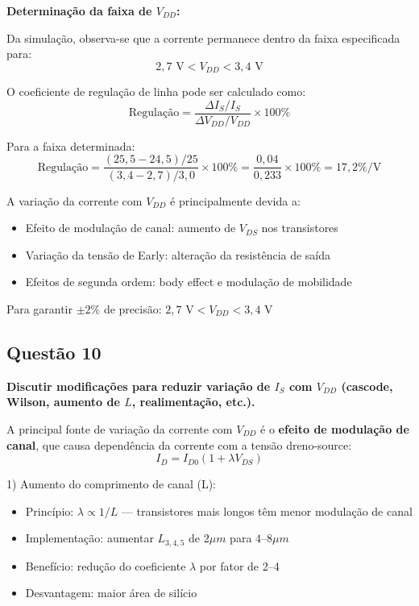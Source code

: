 ﻿\documentclass[12pt,a4paper]{article}
\begin{document}
\textbf{Determinação da faixa de $V_{DD}$:}

Da simulação, observa-se que a corrente permanece dentro da faixa especificada para:
$$2,7 \text{ V} < V_{DD} < 3,4 \text{ V}$$



O coeficiente de regulação de linha pode ser calculado como:
$$\text{Regulação} = \frac{\Delta I_S / I_S}{\Delta V_{DD} / V_{DD}} \times 100\% $$

Para a faixa determinada:
$$\text{Regulação} = \frac{(25,5-24,5)/25}{(3,4-2,7)/3,0} \times 100\% = \frac{0,04}{0,233} \times 100\% = 17,2\%/\text{V}$$



A variação da corrente com $V_{DD}$ é principalmente devida a:
\begin{itemize}
    \item Efeito de modulação de canal: aumento de $V_{DS}$ nos transistores
    \item Variação da tensão de Early: alteração da resistência de saída
    \item Efeitos de segunda ordem: body effect e modulação de mobilidade
\end{itemize}



Para garantir $\pm 2\%$ de precisão: $\boxed{2,7 \text{ V} < V_{DD} < 3,4 \text{ V}}$

\subsection*{Questão 10}
	\textbf{Discutir modificações para reduzir variação de $I_S$ com $V_{DD}$ (cascode, Wilson, aumento de $L$, realimentação, etc.).}



A principal fonte de variação da corrente com $V_{DD}$ é o \textbf{efeito de modulação de canal}, que causa dependência da corrente com a tensão dreno-source:
$$I_D = I_{D0}(1 + \lambda V_{DS}) $$



1) Aumento do comprimento de canal (L):
\begin{itemize}
    \item Princípio: $\lambda \propto 1/L$ — transistores mais longos têm menor modulação de canal
    \item Implementação: aumentar $L_{3,4,5}$ de $2\mu m$ para $4$–$8\mu m$
    \item Benefício: redução do coeficiente $\lambda$ por fator de 2–4
    \item Desvantagem: maior área de silício
\end{itemize}
\end{document}
